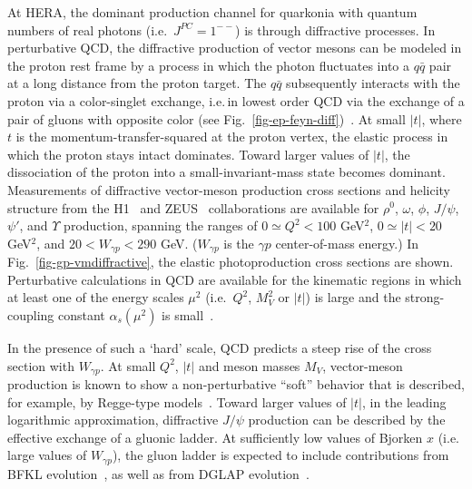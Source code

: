 At HERA, the dominant production channel for quarkonia with quantum
numbers of real photons (i.e.\ $J^{PC}=1^{--}$) is through diffractive
processes.
%
In perturbative QCD, the diffractive production of vector mesons can be
modeled in the proton rest frame by a process in which the photon
fluctuates into a $q\bar{q}$ pair at a long distance from the proton
target.  The $q\bar{q}$ subsequently interacts with the proton via a
color-singlet exchange, i.e.\,in lowest order QCD via the exchange of a
pair of gluons with opposite color
(see Fig.~\ref{fig-ep-feyn-diff})~\cite{Ryskin:1992ui,
Brodsky:1994kf, %
Collins:1996fb, %
Collins:1997sr, %
Teubner:1999pm, %
Bartels:2000ze, %
Hayashigaki:2004iw}.
At small $|t|$, where $t$ is the momentum-transfer-squared at the proton
vertex, the elastic process in which the proton stays intact dominates.
Toward larger values of $|t|$, the dissociation of the proton into a
small-invariant-mass state becomes dominant. Measurements of diffractive
vector-meson production cross sections and helicity structure from the
H1~\cite{Aid:1996bs,Adloff:1999kg, Adloff:1999zs,Adloff:2000vm,
Adloff:2000nx,Adloff:2002tb, Adloff:2002re,Aktas:2003zi,h1-ichep04-6-0180} and
ZEUS~\cite{Breitweg:1998nh,Breitweg:1998ki,
Breitweg:1999jy,Breitweg:1999fm,Breitweg:2000mu,Chekanov:2002rm,
Chekanov:2002xi,Chekanov:2004mw} collaborations are available for
$\rho^0$, $\omega$, $\phi$, $J/\psi$, $\psi'$, and $\Upsilon$
production, spanning the ranges of $0 \simeq Q^2 < 100 $ GeV$^2$, $ 0
\simeq |t| < 20 $ GeV$^2$, and $ 20 < W_{\gamma p} < 290 $ GeV. 
($W_{\gamma p}$ is the $\gamma p$ center-of-mass energy.) In
Fig.~\ref{fig-gp-vmdiffractive}, the elastic photoproduction cross
sections are shown.
Perturbative calculations in QCD are available for the kinematic
regions in which at least one of the energy scales $\mu^2$ (i.e.~$Q^2$, 
$M_V^2$ or $|t|$) is large and the strong-coupling constant
$\alpha_s(\mu^2)$ is small~\cite{Frankfurt:1997fj,%
McDermott:1999fa,%
Frankfurt:2000ez,%
Ryskin:1995hz,%
Martin:1997wy,%
Martin:1999wb,%
Ivanov:2004vd%
}.

In the presence of such a `hard' scale, QCD predicts a steep rise of the
cross section with $W_{\gamma p}$.  At small $Q^2$, $|t|$ and meson
masses $M_V$, vector-meson production is known to show a
non-perturbative ``soft'' behavior that is described, for example, by
Regge-type models~\cite{Regge:mz, Regge:1960zc, Sakurai:1969ss,
Donnachie:1992ny,Donnachie:1998gm}.
%
Toward larger values of $|t|$, in the leading logarithmic approximation,
diffractive $J/\psi$ production can be described by the effective
exchange of a gluonic ladder. At sufficiently low values of Bjorken $x$
(i.e. large values of $W_{\gamma p}$), the gluon ladder is expected to
include contributions from BFKL
evolution~\cite{ FKL:1976, Kuraev:fs, BL:1978, Mueller:1994jq, %
Nikolaev:1993th %
}, as well as from DGLAP evolution~\cite{Gribov:ri}.

